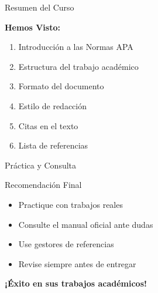 \documentclass[aspectratio=169]{beamer}
\begin{document}
\begin{frame}{Resumen del Curso}
\begin{center}
\textbf{Hemos Visto:}
\vspace{0.5cm}

\begin{enumerate}
    \item Introducción a las Normas APA
    \item Estructura del trabajo académico
    \item Formato del documento
    \item Estilo de redacción
    \item Citas en el texto
    \item Lista de referencias
\end{enumerate}
\end{center}
\end{frame}

\begin{frame}{Práctica y Consulta}
\begin{block}{Recomendación Final}
\begin{itemize}
    \item Practique con trabajos reales
    \item Consulte el manual oficial ante dudas
    \item Use gestores de referencias
    \item Revise siempre antes de entregar
\end{itemize}
\end{block}

\vspace{0.5cm}
\begin{center}
\Large \textbf{¡Éxito en sus trabajos académicos!}
\end{center}
\end{frame}
\end{document}
